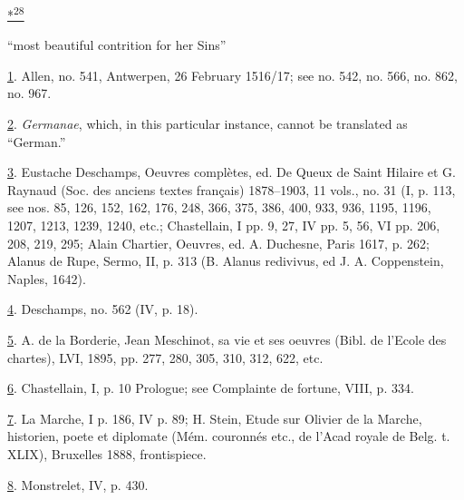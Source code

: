 \protect\hypertarget{23_NOTES.xhtmlux5cux23id_2464}{\protect\hyperlink{09_Chapter_Two__THE_CRAVING_FOR_A_M.xhtmlux5cux23id_2463}{*\textsuperscript{28}}}
``most beautiful contrition for her Sins''

\protect\hypertarget{23_NOTES.xhtmlux5cux23id_2085}{\protect\hyperlink{09_Chapter_Two__THE_CRAVING_FOR_A_M.xhtmlux5cux23id_2084}{1}}.
Allen, no. 541, Antwerpen, 26 February 1516/17; see no. 542, no. 566,
no. 862, no. 967.

\protect\hypertarget{23_NOTES.xhtmlux5cux23id_2083}{\protect\hyperlink{09_Chapter_Two__THE_CRAVING_FOR_A_M.xhtmlux5cux23id_2082}{2}}.
\emph{Germanae}, which, in this particular instance, cannot be
translated as ``German.''

\protect\hypertarget{23_NOTES.xhtmlux5cux23id_2081}{\protect\hyperlink{09_Chapter_Two__THE_CRAVING_FOR_A_M.xhtmlux5cux23id_2080}{3}}.
Eustache Deschamps, Oeuvres complètes, ed. De Queux de Saint Hilaire et
G. Raynaud (Soc. des anciens textes français) 1878--1903, 11 vols., no.
31 (I, p. 113, see nos. 85, 126, 152, 162, 176, 248, 366, 375, 386, 400,
933, 936, 1195, 1196, 1207, 1213, 1239, 1240, etc.; Chastellain, I pp.
9, 27, IV pp. 5, 56, VI pp. 206, 208, 219, 295; Alain Chartier, Oeuvres,
ed. A. Duchesne, Paris 1617, p. 262; Alanus de Rupe, Sermo, II, p. 313
(B. Alanus redivivus, ed J. A. Coppenstein, Naples, 1642).

\protect\hypertarget{23_NOTES.xhtmlux5cux23id_2079}{\protect\hyperlink{09_Chapter_Two__THE_CRAVING_FOR_A_M.xhtmlux5cux23id_2078}{4}}.
Deschamps, no. 562 (IV, p. 18).

\protect\hypertarget{23_NOTES.xhtmlux5cux23id_2077}{\protect\hyperlink{09_Chapter_Two__THE_CRAVING_FOR_A_M.xhtmlux5cux23id_2076}{5}}.
A. de la Borderie, Jean Meschinot, sa vie et ses oeuvres (Bibl. de
l'Ecole des chartes), LVI, 1895, pp. 277, 280, 305, 310, 312, 622, etc.

\protect\hypertarget{23_NOTES.xhtmlux5cux23id_2075}{\protect\hyperlink{09_Chapter_Two__THE_CRAVING_FOR_A_M.xhtmlux5cux23id_2074}{6}}.
Chastellain, I, p. 10 Prologue; see Complainte de fortune, VIII, p. 334.

\protect\hypertarget{23_NOTES.xhtmlux5cux23id_2073}{\protect\hyperlink{09_Chapter_Two__THE_CRAVING_FOR_A_M.xhtmlux5cux23id_2072}{7}}.
La Marche, I p. 186, IV p. 89; H. Stein, Etude sur Olivier de la Marche,
historien, poete et diplomate (Mém. couronnés etc., de l'Acad royale de
Belg. t. XLIX), Bruxelles 1888, frontispiece.

\protect\hypertarget{23_NOTES.xhtmlux5cux23id_2071}{\protect\hyperlink{09_Chapter_Two__THE_CRAVING_FOR_A_M.xhtmlux5cux23id_2070}{8}}.
Monstrelet, IV, p. 430.

